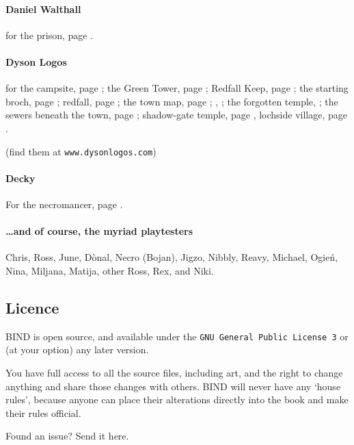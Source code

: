 \begin{multicols}{2}
\paragraph{Daniel Walthall}
for the prison, page \pageref{Daniel_Walthall/prison}.

\paragraph{Dyson Logos}

for the
campsite, page \pageref{Dyson_Logos/forgotten_city};
the Green Tower, page \pageref{Dyson_Logos/green_tower};
Redfall Keep, page \pageref{Dyson_Logos/redfall_keep};
the starting \gls{broch}, page \pageref{Dyson_Logos/broch_map};
\gls{redfall}, page \pageref{Dyson_Logos/redfall};
the town map, page \pageref{Dyson_Logos/town};
, \pageref{Dyson_Logos/mincing_pig};
the forgotten temple, \pageref{Dyson_Logos/qualme_temple};
the sewers beneath the town, page \pageref{Dyson_Logos/sewer};
shadow-gate temple, page \pageref{Dyson_Logos/shadow_gate},
lochside village, page \pageref{Dyson_Logos/lochside}.

(find them at {\tt www.dysonlogos.com})

\paragraph{Decky}

For the necromancer, page \pageref{Decky/necromancer}.

\paragraph{\ldots and of course, the myriad playtesters}
Chris, Ross, June, D\`onal,
Necro (Bojan), Jigzo, Nibbly, Reavy,
Michael, Ogie\'n,
Nina, Miljana, Matija, other Ross, Rex, and
Niki.

\subsection*{Licence}

BIND is open source, and available under the {\tt GNU General Public License 3} or (at your option) any later version.

You have full access to all the source files, including art, and the right to change anything and share those changes with others.
BIND will never have any `house rules', because anyone can place their alterations directly into the book and make their rules official.

\begin{center}
  
  Found an issue?
  Send it here.
\end{center}

\end{multicols}

\pagebreak
